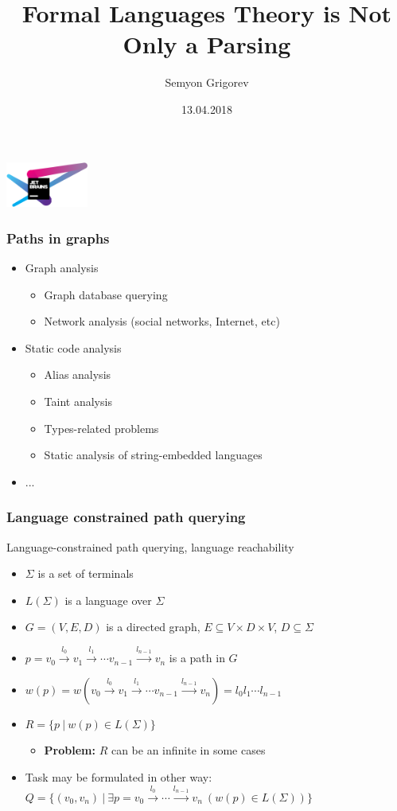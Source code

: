 \documentclass[xcolor=table,aspectratio=169]{beamer}
\title[CFPQ]{Formal Languages Theory is Not Only a Parsing}
\institute[JetBrains Research]{
JetBrains Research, Programming Languages and Tools Lab
}
\author[Semyon Grigorev]{Semyon Grigorev}
\date{13.04.2018}
\begin{document}
{
\begin{frame}[fragile]
   \begin{center}
      \includegraphics[height=1.5cm]{pictures/JBLogo3.pdf}
    \end{center}
  \titlepage
\end{frame}
}

\begin{frame}[fragile]
  \transwipe[direction=90]
  \frametitle{Paths in graphs}
  \begin{itemize}
  \item Graph analysis
    \begin{itemize}
        \item Graph database querying
        \item Network analysis (social networks, Internet, etc)
    \end{itemize}
  \item Static code analysis
      \begin{itemize}
        \item Alias analysis
        \item Taint analysis
        \item Types-related problems
        \item Static analysis of string-embedded languages
      \end{itemize}
   \item ...
  \end{itemize}
\end{frame}

\begin{frame}[fragile]
  \transwipe[direction=90]
  \frametitle{Language constrained path querying}
  Language-constrained path querying, language reachability
  \begin{itemize}
  \item $\Sigma$ is a set of terminals 
  \item $L(\Sigma)$ is a language over $\Sigma$
  \item $G = (V,E,D)$ is a directed graph, $E \subseteq V\times D \times V$, $D\subseteq \Sigma$
  \item $p = v_0 \xrightarrow{l_0} v_1 \xrightarrow{l_1} \cdots v_{n-1}\xrightarrow{l_{n-1}}v_n$ is a path in $G$
  \item $w(p) = w(v_0 \xrightarrow{l_0} v_1 \xrightarrow{l_1} \cdots v_{n-1}\xrightarrow{l_{n-1}}v_n) = l_0 l_1 \cdots l_{n-1}$
  \item $R =\{ p \ | \ w(p) \in L(\Sigma)\}$
  \begin{itemize}
    \item \textbf{Problem:} $R$ can be an infinite in some cases
  \end{itemize}
  \item Task may be formulated in other way: $Q =\{ (v_0,v_n) \ | \ \exists p = v_0 \xrightarrow{l_0} \cdots \xrightarrow{l_{n-1}}v_n \ (w(p) \in 
  L(\Sigma))\}$
  \end{itemize}
\end{frame}
\end{document}
